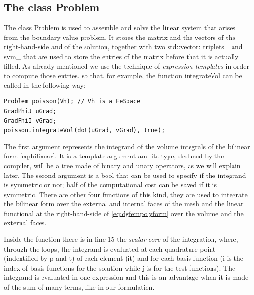 \documentclass[12pt, a4paper]{article}
\newcommand{\code}[1]{{\footnotesize\ttfamily #1}}
\theoremstyle{definition}
\theoremstyle{plain}
\theoremstyle{plain}
\theoremstyle{definition}
\begin{document}
\subsection{The class Problem}

The class \code{Problem} is used to assemble and solve the linear system that arises from the boundary value problem.
It stores the matrix and the vectors of the right-hand-side and of the solution, together with two \code{std::vector}: \code{triplets\_} and \code{sym\_} that are used to store the entries of the matrix before that it is actually filled.
As already mentioned we use the technique of \emph{expression templates} in order to compute those entries, so that, for example, the function \code{integrateVol} can be called in the following way:
\begin{lstlisting}
Problem poisson(Vh); // Vh is a FeSpace
GradPhiJ uGrad;
GradPhiI vGrad;
poisson.integrateVol(dot(uGrad, vGrad), true);
\end{lstlisting}
The first argument represents the integrand of the volume integrals of the bilinear form \eqref{eq:bilinear}. It is a template argument and its type, deduced by the compiler, will be a tree made of binary and unary operators, as we will explain later.
The second argument is a \code{bool} that can be used to specify if the integrand is symmetric or not; half of the computational cost can be saved if it is symmetric. There are other four functions of this kind, they are used to integrate the bilinear form over the external and internal faces of the mesh and the linear functional at the right-hand-side of \eqref{eq:dgfempolyform} over the volume and the external faces.

Inside the function there is in line 15 the \emph{scalar core} of the integration, where, through the loops, the integrand is evaluated at each quadrature point (indentified by \code{p} and \code{t}) of each element (\code{*it}) and for each basis function (\code{i} is the index of basis functions for the solution while \code{j} is for the test functions). The integrand is evaluated in one expression and this is an advantage when it is made of the sum of many terms, like in our formulation.\\
\end{document}
